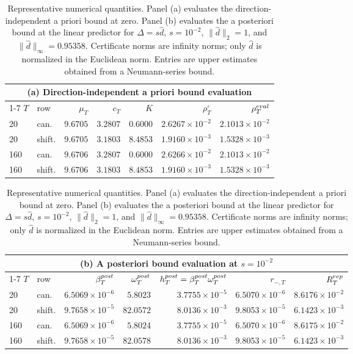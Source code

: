 \documentclass[twocolumn,nameyear,amsthm]{autart}
\numberwithin{equation}{section}
\begin{document}
\begin{table}[t]
\caption{Representative numerical quantities.  Panel (a) evaluates the
direction-independent a priori bound at zero.  Panel (b) evaluates the
a posteriori bound at the linear predictor for $\Delta=s\widehat d$,
$s=10^{-2}$, $\|\widehat d\|_2=1$, and
$\|\widehat d\|_\infty=0.95358$.  Certificate norms are infinity norms;
only $\widehat d$ is normalized in the Euclidean norm.  Entries are upper
estimates obtained from a Neumann-series bound.}
\label{tab:certificate-inputs}
\centering\scriptsize
\renewcommand{\arraystretch}{1.00}
\begin{tabular}{@{}llrrrrr@{}}
\toprule
\multicolumn{7}{c}{(a) Direction-independent a priori bound evaluation}\\
\cmidrule(lr){1-7}
$T$ & row & $\mu_T$ & $c_T$ & $K$ & $\rho_T^\circ$
& $\rho_T^{\rm eval}$\\
\midrule
20  & can.   & $9.6705$ & $3.2807$ & $0.6000$
    & $2.6267{\times}10^{-2}$ & $2.1013{\times}10^{-2}$\\
20  & shift. & $9.6705$ & $3.1803$ & $8.4853$
    & $1.9160{\times}10^{-3}$ & $1.5328{\times}10^{-3}$\\
160 & can.   & $9.6706$ & $3.2807$ & $0.6000$
    & $2.6266{\times}10^{-2}$ & $2.1013{\times}10^{-2}$\\
160 & shift. & $9.6706$ & $3.1803$ & $8.4853$
    & $1.9160{\times}10^{-3}$ & $1.5328{\times}10^{-3}$\\
\bottomrule
\end{tabular}

\smallskip
\begin{tabular}{@{}llrrrrr@{}}
\toprule
\multicolumn{7}{c}{(b) A posteriori bound evaluation at $s=10^{-2}$}\\
\cmidrule(lr){1-7}
$T$ & row & $\beta_T^{\rm post}$ & $\omega_T^{\rm post}$
& $h_T^{\rm post}=\beta_T^{\rm post}\omega_T^{\rm post}$
& $r_{-,T}$ & $R_T^{\rm rep}$\\
\midrule
20  & can.   & $6.5069{\times}10^{-6}$ & $5.8023$
    & $3.7755{\times}10^{-5}$ & $6.5070{\times}10^{-6}$
    & $8.6176{\times}10^{-2}$\\
20  & shift. & $9.7658{\times}10^{-5}$ & $82.0572$
    & $8.0136{\times}10^{-3}$ & $9.8053{\times}10^{-5}$
    & $6.1423{\times}10^{-3}$\\
160 & can.   & $6.5069{\times}10^{-6}$ & $5.8024$
    & $3.7755{\times}10^{-5}$ & $6.5070{\times}10^{-6}$
    & $8.6175{\times}10^{-2}$\\
160 & shift. & $9.7658{\times}10^{-5}$ & $82.0578$
    & $8.0136{\times}10^{-3}$ & $9.8053{\times}10^{-5}$
    & $6.1423{\times}10^{-3}$\\
\bottomrule
\end{tabular}


\end{table}
\end{document}
